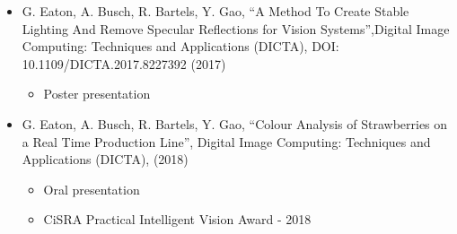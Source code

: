 \documentclass[fleqn,twoside]{article}
\renewcommand{\baselinestretch}{2}
\begin{document}
\begin{itemize}
	\item{G. Eaton, A. Busch, R. Bartels, Y. Gao, “A Method To Create Stable Lighting And Remove Specular Reflections for Vision Systems”,Digital Image Computing: Techniques and Applications (DICTA), DOI: 10.1109/DICTA.2017.8227392 (2017)}
	\begin{itemize}
		\item Poster presentation 
	\end{itemize}
	\quad
	\item{G. Eaton, A. Busch, R. Bartels, Y. Gao, “Colour Analysis of Strawberries on a Real Time Production Line”, Digital Image Computing: Techniques and Applications (DICTA), (2018)}
	\begin{itemize}
		\item Oral presentation 
		\item CiSRA Practical Intelligent Vision Award - 2018
	\end{itemize}
\end{itemize}  



\vspace*{\fill}%



\renewcommand{\baselinestretch}{1.0} 
\newpage
\tableofcontents

\newpage
\listoffigures

\newpage
\listoftables

%
%
%
%
%

%

%
%
\end{document}
